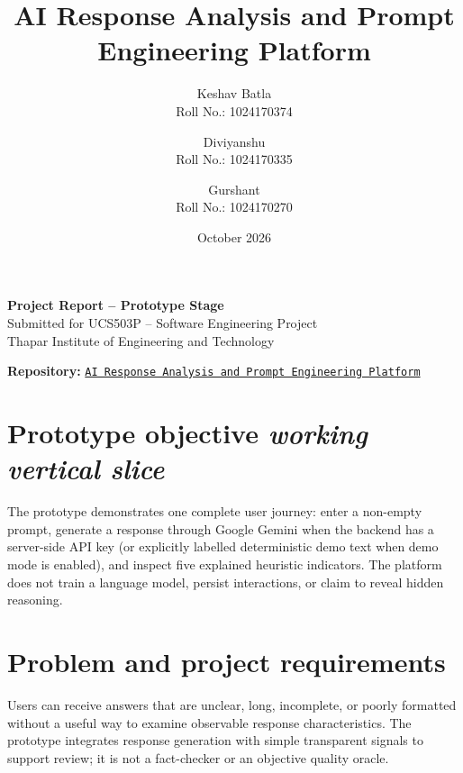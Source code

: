 \documentclass[11pt,a4paper]{article}
\title{AI Response Analysis and Prompt Engineering Platform}
\author{Keshav Batla\\Roll No.: 1024170374
  \and Diviyanshu\\Roll No.: 1024170335
  \and Gurshant\\Roll No.: 1024170270}
\date{October 2026}
\newcommand{\BvrHint}[1]{{\normalfont\normalsize\itshape\hfill #1}}
\begin{document}
\maketitle
\begin{center}
\large\textbf{Project Report -- Prototype Stage}\\[4pt]
Submitted for UCS503P -- Software Engineering Project\\
Thapar Institute of Engineering and Technology
\end{center}
\vspace{0.4em}
\noindent\textbf{Repository:}
\href{https://github.com/KeshavBatla/AI_RESPONSE-ANALYSIS_AND_PROMPT_ENGINEERING-PLATFORM}
{\texttt{AI Response Analysis and Prompt Engineering Platform}}

\section{Prototype objective \BvrHint{working vertical slice}}
The prototype demonstrates one complete user journey: enter a non-empty prompt,
generate a response through Google Gemini when the backend has a server-side API
key (or explicitly labelled deterministic demo text when demo mode is enabled),
and inspect five explained heuristic indicators. The platform does not train a
language model, persist interactions, or claim to reveal hidden reasoning.

\section{Problem and project requirements}
Users can receive answers that are unclear, long, incomplete, or poorly
formatted without a useful way to examine observable response characteristics.
The prototype integrates response generation with simple transparent signals
to support review; it is not a fact-checker or an objective quality oracle.
\end{document}
